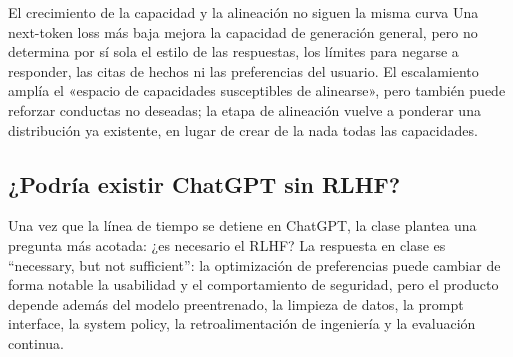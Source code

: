 


\begin{warningbox}{El crecimiento de la capacidad y la alineación no siguen la misma curva}
Una next-token loss más baja mejora la capacidad de generación general, pero no determina por sí sola el estilo de las respuestas, los límites para negarse a responder, las citas de hechos ni las preferencias del usuario. El escalamiento amplía el «espacio de capacidades susceptibles de alinearse», pero también puede reforzar conductas no deseadas; la etapa de alineación vuelve a ponderar una distribución ya existente, en lugar de crear de la nada todas las capacidades.
\end{warningbox}




\subsection{¿Podría existir ChatGPT sin RLHF?}

Una vez que la línea de tiempo se detiene en ChatGPT, la clase plantea una pregunta más acotada: ¿es necesario el RLHF? La respuesta en clase es ``necessary, but not sufficient'': la optimización de preferencias puede cambiar de forma notable la usabilidad y el comportamiento de seguridad, pero el producto depende además del modelo preentrenado, la limpieza de datos, la prompt interface, la system policy, la retroalimentación de ingeniería y la evaluación continua.

